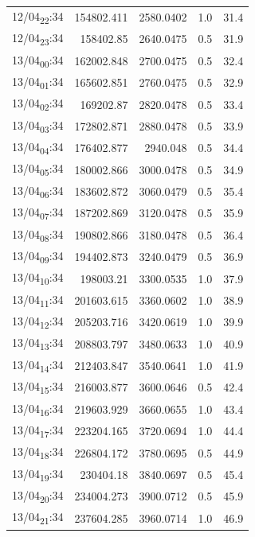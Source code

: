 \documentclass[11pt]{article}
\begin{document}
\begin{center}
\begin{tabular}{lrrrr}
12/04\textsubscript{22}:34 & 154802.411 & 2580.0402 & 1.0 & 31.4\\[0pt]
12/04\textsubscript{23}:34 & 158402.85 & 2640.0475 & 0.5 & 31.9\\[0pt]
13/04\textsubscript{00}:34 & 162002.848 & 2700.0475 & 0.5 & 32.4\\[0pt]
13/04\textsubscript{01}:34 & 165602.851 & 2760.0475 & 0.5 & 32.9\\[0pt]
13/04\textsubscript{02}:34 & 169202.87 & 2820.0478 & 0.5 & 33.4\\[0pt]
13/04\textsubscript{03}:34 & 172802.871 & 2880.0478 & 0.5 & 33.9\\[0pt]
13/04\textsubscript{04}:34 & 176402.877 & 2940.048 & 0.5 & 34.4\\[0pt]
13/04\textsubscript{05}:34 & 180002.866 & 3000.0478 & 0.5 & 34.9\\[0pt]
13/04\textsubscript{06}:34 & 183602.872 & 3060.0479 & 0.5 & 35.4\\[0pt]
13/04\textsubscript{07}:34 & 187202.869 & 3120.0478 & 0.5 & 35.9\\[0pt]
13/04\textsubscript{08}:34 & 190802.866 & 3180.0478 & 0.5 & 36.4\\[0pt]
13/04\textsubscript{09}:34 & 194402.873 & 3240.0479 & 0.5 & 36.9\\[0pt]
13/04\textsubscript{10}:34 & 198003.21 & 3300.0535 & 1.0 & 37.9\\[0pt]
13/04\textsubscript{11}:34 & 201603.615 & 3360.0602 & 1.0 & 38.9\\[0pt]
13/04\textsubscript{12}:34 & 205203.716 & 3420.0619 & 1.0 & 39.9\\[0pt]
13/04\textsubscript{13}:34 & 208803.797 & 3480.0633 & 1.0 & 40.9\\[0pt]
13/04\textsubscript{14}:34 & 212403.847 & 3540.0641 & 1.0 & 41.9\\[0pt]
13/04\textsubscript{15}:34 & 216003.877 & 3600.0646 & 0.5 & 42.4\\[0pt]
13/04\textsubscript{16}:34 & 219603.929 & 3660.0655 & 1.0 & 43.4\\[0pt]
13/04\textsubscript{17}:34 & 223204.165 & 3720.0694 & 1.0 & 44.4\\[0pt]
13/04\textsubscript{18}:34 & 226804.172 & 3780.0695 & 0.5 & 44.9\\[0pt]
13/04\textsubscript{19}:34 & 230404.18 & 3840.0697 & 0.5 & 45.4\\[0pt]
13/04\textsubscript{20}:34 & 234004.273 & 3900.0712 & 0.5 & 45.9\\[0pt]
13/04\textsubscript{21}:34 & 237604.285 & 3960.0714 & 1.0 & 46.9\\[0pt]

\end{tabular}
\end{center}
\end{document}
